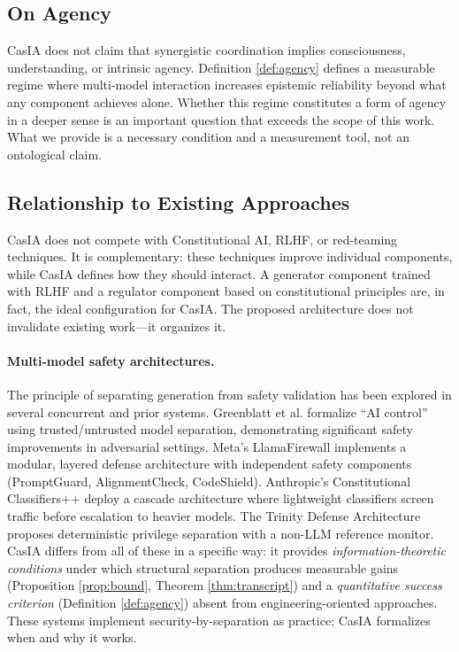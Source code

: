 \documentclass[11pt,a4paper]{article}
\theoremstyle{remark}
\begin{document}
\subsection{On Agency}

CasIA does not claim that synergistic coordination implies consciousness, understanding, or intrinsic agency. Definition \ref{def:agency} defines a measurable regime where multi-model interaction increases epistemic reliability beyond what any component achieves alone. Whether this regime constitutes a form of agency in a deeper sense is an important question that exceeds the scope of this work. What we provide is a necessary condition and a measurement tool, not an ontological claim.

\subsection{Relationship to Existing Approaches}

CasIA does not compete with Constitutional AI, RLHF, or red-teaming techniques. It is complementary: these techniques improve individual components, while CasIA defines how they should interact. A generator component trained with RLHF and a regulator component based on constitutional principles are, in fact, the ideal configuration for CasIA. The proposed architecture does not invalidate existing work---it organizes it.

\paragraph{Multi-model safety architectures.} The principle of separating generation from safety validation has been explored in several concurrent and prior systems. Greenblatt et al. \cite{greenblatt2024control} formalize ``AI control'' using trusted/untrusted model separation, demonstrating significant safety improvements in adversarial settings. Meta's LlamaFirewall \cite{llamafirewall2025} implements a modular, layered defense architecture with independent safety components (PromptGuard, AlignmentCheck, CodeShield). Anthropic's Constitutional Classifiers++ \cite{anthropic2026cc} deploy a cascade architecture where lightweight classifiers screen traffic before escalation to heavier models. The Trinity Defense Architecture \cite{trinity2025} proposes deterministic privilege separation with a non-LLM reference monitor. CasIA differs from all of these in a specific way: it provides \emph{information-theoretic conditions} under which structural separation produces measurable gains (Proposition \ref{prop:bound}, Theorem \ref{thm:transcript}) and a \emph{quantitative success criterion} (Definition \ref{def:agency}) absent from engineering-oriented approaches. These systems implement security-by-separation as practice; CasIA formalizes when and why it works.
\end{document}
